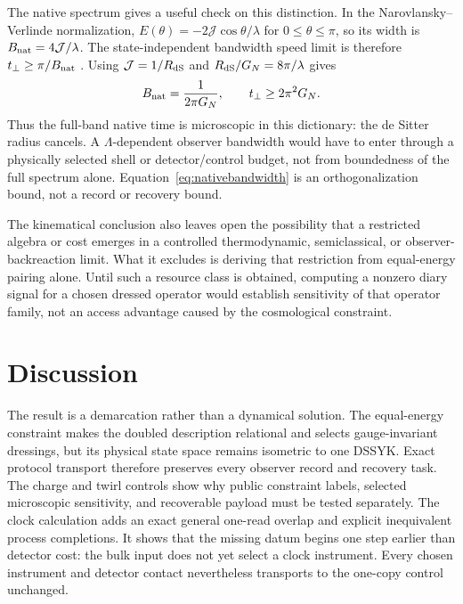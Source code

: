 \documentclass[11pt]{article}
\begin{document}
The native spectrum gives a useful check on this distinction.  In the
Narovlansky--Verlinde normalization,
$E(\theta)=-2\mathcal J\cos\theta/\lambda$ for
$0\leq\theta\leq\pi$, so its width is
$B_{\rm nat}=4\mathcal J/\lambda$.  The state-independent bandwidth speed
limit is therefore $t_\perp\geq\pi/B_{\rm nat}$
\citep{NessBandwidth}.  Using $\mathcal J=1/R_{\rm dS}$ and
$R_{\rm dS}/G_N=8\pi/\lambda$ gives
\begin{equation}
  B_{\rm nat}=\frac{1}{2\pi G_N},
  \qquad t_\perp\geq 2\pi^2G_N.
  \label{eq:nativebandwidth}
\end{equation}
Thus the full-band native time is microscopic in this dictionary: the de
Sitter radius cancels.  A $\Lambda$-dependent observer bandwidth would have to
enter through a physically selected shell or detector/control budget, not
from boundedness of the full spectrum alone.  Equation~\eqref{eq:nativebandwidth}
is an orthogonalization bound, not a record or recovery bound.

The kinematical conclusion also leaves open the possibility that a
restricted algebra or cost emerges in a controlled thermodynamic,
semiclassical, or observer-backreaction limit.  What it excludes is deriving
that restriction from equal-energy pairing alone.  Until such a resource
class is obtained, computing a nonzero diary signal for a chosen dressed
operator would establish sensitivity of that operator family, not an access
advantage caused by the cosmological constraint.

\section{Discussion}
\label{sec:discussion}

The result is a demarcation rather than a dynamical solution.  The
equal-energy constraint makes the doubled description relational and selects
gauge-invariant dressings, but its physical state space remains isometric to
one DSSYK.  Exact protocol transport therefore preserves every observer
record and recovery task.  The charge and twirl controls show why public
constraint labels, selected microscopic sensitivity, and recoverable payload
must be tested separately.  The clock calculation adds an exact general
one-read overlap and explicit inequivalent process completions.  It shows that
the missing datum begins one step earlier than detector cost: the bulk input
does not yet select a clock instrument.  Every chosen instrument and detector
contact nevertheless transports to the one-copy control unchanged.
\end{document}
